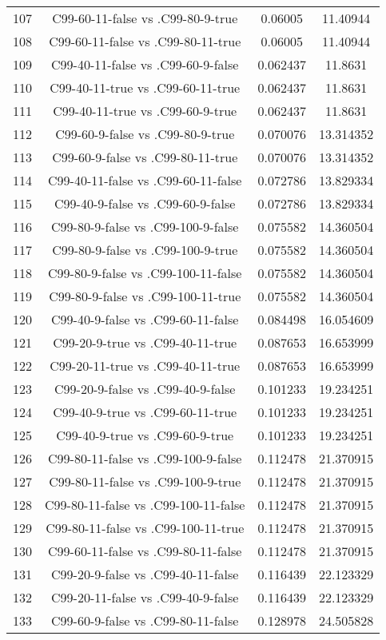 \documentclass[a4paper,10pt]{article}
\begin{document}
\begin{landscape}
\begin{table}[!htp]
\begin{tabular}{cccc}
107&C99-60-11-false vs .C99-80-9-true&0.06005&11.40944\\
108&C99-60-11-false vs .C99-80-11-true&0.06005&11.40944\\
109&C99-40-11-false vs .C99-60-9-false&0.062437&11.8631\\
110&C99-40-11-true vs .C99-60-11-true&0.062437&11.8631\\
111&C99-40-11-true vs .C99-60-9-true&0.062437&11.8631\\
112&C99-60-9-false vs .C99-80-9-true&0.070076&13.314352\\
113&C99-60-9-false vs .C99-80-11-true&0.070076&13.314352\\
114&C99-40-11-false vs .C99-60-11-false&0.072786&13.829334\\
115&C99-40-9-false vs .C99-60-9-false&0.072786&13.829334\\
116&C99-80-9-false vs .C99-100-9-false&0.075582&14.360504\\
117&C99-80-9-false vs .C99-100-9-true&0.075582&14.360504\\
118&C99-80-9-false vs .C99-100-11-false&0.075582&14.360504\\
119&C99-80-9-false vs .C99-100-11-true&0.075582&14.360504\\
120&C99-40-9-false vs .C99-60-11-false&0.084498&16.054609\\
121&C99-20-9-true vs .C99-40-11-true&0.087653&16.653999\\
122&C99-20-11-true vs .C99-40-11-true&0.087653&16.653999\\
123&C99-20-9-false vs .C99-40-9-false&0.101233&19.234251\\
124&C99-40-9-true vs .C99-60-11-true&0.101233&19.234251\\
125&C99-40-9-true vs .C99-60-9-true&0.101233&19.234251\\
126&C99-80-11-false vs .C99-100-9-false&0.112478&21.370915\\
127&C99-80-11-false vs .C99-100-9-true&0.112478&21.370915\\
128&C99-80-11-false vs .C99-100-11-false&0.112478&21.370915\\
129&C99-80-11-false vs .C99-100-11-true&0.112478&21.370915\\
130&C99-60-11-false vs .C99-80-11-false&0.112478&21.370915\\
131&C99-20-9-false vs .C99-40-11-false&0.116439&22.123329\\
132&C99-20-11-false vs .C99-40-9-false&0.116439&22.123329\\
133&C99-60-9-false vs .C99-80-11-false&0.128978&24.505828\\

\end{tabular}
\end{table}
\end{landscape}
\end{document}
